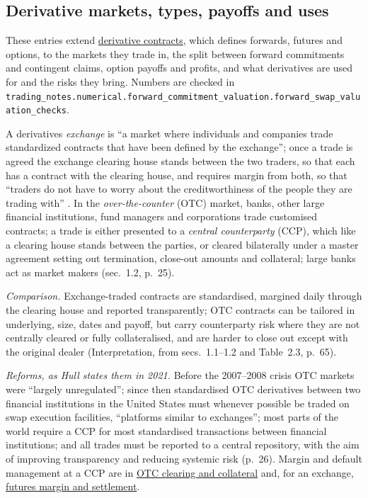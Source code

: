 \subsection{Derivative markets, types, payoffs and uses}

These entries extend \hyperref[def:derivative-contracts]{derivative contracts}, which defines forwards, futures and options, to the markets they trade in, the split between forward commitments and contingent claims, option payoffs and profits, and what derivatives are used for and the risks they bring. Numbers are checked in \nolinkurl{trading_notes.numerical.forward_commitment_valuation.forward_swap_valuation_checks}.

\begin{qfdefinition}\label{def:derivative-markets-otc-exchange}
 A derivatives \emph{exchange} is ``a market where individuals and companies trade standardized contracts that have been defined by the exchange''; once a trade is agreed the exchange clearing house stands between the two traders, so that each has a contract with the clearing house, and requires margin from both, so that ``traders do not have to worry about the creditworthiness of the people they are trading with'' \citep[chap.~1, sec.~1.1, pp.~24--25]{s7-hulloptions}. In the \emph{over-the-counter} (OTC) market, banks, other large financial institutions, fund managers and corporations trade customised contracts; a trade is either presented to a \emph{central counterparty} (CCP), which like a clearing house stands between the parties, or cleared bilaterally under a master agreement setting out termination, close-out amounts and collateral; large banks act as market makers (sec.~1.2, p.~25).

\emph{Comparison.} Exchange-traded contracts are standardised, margined daily through the clearing house and reported transparently; OTC contracts can be tailored in underlying, size, dates and payoff, but carry counterparty risk where they are not centrally cleared or fully collateralised, and are harder to close out except with the original dealer (Interpretation, from secs.~1.1--1.2 and Table~2.3, p.~65).

 \emph{Reforms, as Hull states them in 2021.} Before the 2007--2008 crisis OTC markets were ``largely unregulated''; since then standardised OTC derivatives between two financial institutions in the United States must whenever possible be traded on swap execution facilities, ``platforms similar to exchanges''; most parts of the world require a CCP for most standardised transactions between financial institutions; and all trades must be reported to a central repository, with the aim of improving transparency and reducing systemic risk (p.~26). Margin and default management at a CCP are in \hyperref[mech:otc-clearing-collateral]{OTC clearing and collateral} and, for an exchange, \hyperref[mech:futures-margin-settlement]{futures margin and settlement}.


\end{qfdefinition}
